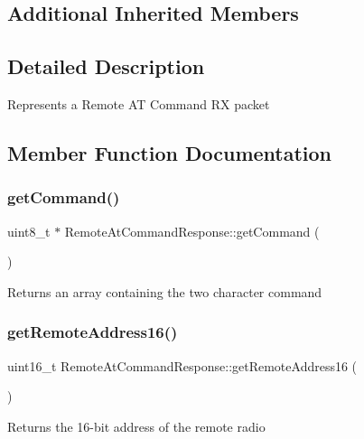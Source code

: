 \subsection*{Additional Inherited Members}


\subsection{Detailed Description}
Represents a Remote AT Command RX packet 

\subsection{Member Function Documentation}
\hypertarget{class_remote_at_command_response_a6d26d626de8b8d0eaf8241b92ff39f28}{}\label{class_remote_at_command_response_a6d26d626de8b8d0eaf8241b92ff39f28} 
\subsubsection{\texorpdfstring{get\+Command()}{getCommand()}}
{\footnotesize\ttfamily uint8\+\_\+t $\ast$ Remote\+At\+Command\+Response\+::get\+Command (\begin{DoxyParamCaption}{ }\end{DoxyParamCaption})}

Returns an array containing the two character command \hypertarget{class_remote_at_command_response_a2bea13bca12330a2eb1da3e3f0224bde}{}\label{class_remote_at_command_response_a2bea13bca12330a2eb1da3e3f0224bde} 
\subsubsection{\texorpdfstring{get\+Remote\+Address16()}{getRemoteAddress16()}}
{\footnotesize\ttfamily uint16\+\_\+t Remote\+At\+Command\+Response\+::get\+Remote\+Address16 (\begin{DoxyParamCaption}{ }\end{DoxyParamCaption})}

Returns the 16-\/bit address of the remote radio \hypertarget{class_remote_at_command_response_ab87802214e04a7058ed0dc9668e70e73}{}\label{class_remote_at_command_response_ab87802214e04a7058ed0dc9668e70e73} 
